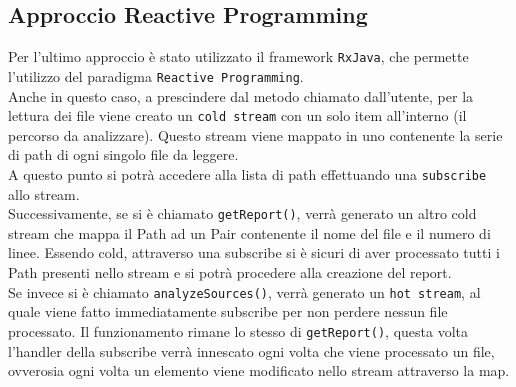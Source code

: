 \documentclass{article}
\begin{document}
    \subsection{Approccio Reactive Programming}
    Per l’ultimo approccio è stato utilizzato il framework \texttt{RxJava}, che permette l’utilizzo del paradigma \texttt{Reactive Programming}.
    \\
    Anche in questo caso, a prescindere dal metodo chiamato dall’utente, per la lettura dei file viene creato un \texttt{cold stream} con un solo item all’interno (il percorso da analizzare). Questo stream viene mappato in uno contenente la serie di path di ogni singolo file da leggere.
    \\
    A questo punto si potrà accedere alla lista di path effettuando una \texttt{subscribe} allo stream.
    \\
    Successivamente, se si è chiamato \texttt{getReport()}, verrà generato un altro cold stream che mappa il Path ad un Pair contenente il nome del file e il numero di linee. Essendo cold, attraverso una subscribe si è sicuri di aver processato tutti i Path presenti nello stream e si potrà procedere alla creazione del report.
    \\
    Se invece si è chiamato \texttt{analyzeSources()}, verrà generato un \texttt{hot stream}, al quale viene fatto immediatamente subscribe per non perdere nessun file processato. Il funzionamento rimane lo stesso di \texttt{getReport()}, questa volta l’handler della subscribe verrà innescato ogni volta che viene processato un file, ovverosia ogni volta un elemento viene modificato nello stream attraverso la map.

    \clearpage
\end{document}
